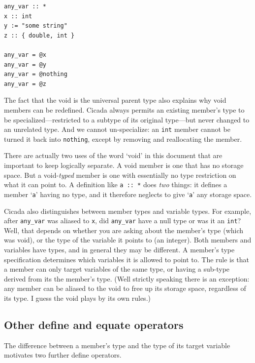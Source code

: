 \documentclass{article}
\newenvironment{code}{
       \begin{list}{}{
               \setlength{\leftmargin}{.4in}
               \setlength{\rightmargin}{0in}
               \setlength{\topsep}{.2in}
       }
       \small
       \item[] }
       { \end{list}   }
\begin{document}
\begin{code} \begin{verbatim}
any_var :: *
x :: int
y := "some string"
z :: { double, int }

any_var = @x
any_var = @y
any_var = @nothing
any_var = @z
\end{verbatim} \end{code}

The fact that the void is the universal parent type also explains why void members can be redefined.  Cicada always permits an existing member's type to be specialized---restricted to a subtype of its original type---but never changed to an unrelated type.  And we cannot un-specialize:  an \verb#int# member cannot be turned it back into \verb#nothing#, except by removing and reallocating the member.

There are actually two uses of the word `void' in this document that are important to keep logically separate.  A void member is one that has no storage space.  But a void-\emph{typed} member is one with essentially no type restriction on what it can point to.  A definition like \verb#a :: *# does \emph{two} things:  it defines a member `\verb#a#' having no type, and it therefore neglects to give `\verb#a#' any storage space.

Cicada also distinguishes between member types and variable types.  For example, after \texttt{any\_var} was aliased to \texttt{x}, did \texttt{any\_var} have a null type or was it an \verb#int#?  Well, that depends on whether you are asking about the member's type (which was void), or the type of the variable it points to (an integer).  Both members and variables have types, and in general they may be different.  A member's type specification determines which variables it is allowed to point to.  The rule is that a member can only target variables of the same type, or having a sub-type derived from its the member's type.  (Well strictly speaking there is an exception:  any member can be aliased to the void to free up its storage space, regardless of its type.  I guess the void plays by its own rules.)\\




\subsection{Other define and equate operators}

The difference between a member's type and the type of its target variable motivates two further define operators.
\end{document}
